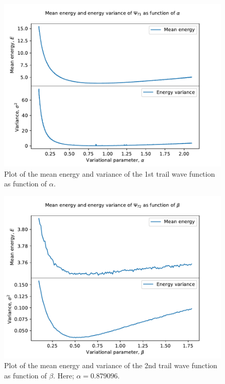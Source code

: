 \documentclass[12pt,english,a4paper]{article}
\begin{document}
\begin{figure}[H]
    \centering
    \includegraphics[scale=0.7]{../figures/plot_minima_trail_1.pdf}
    \caption{Plot of the mean energy and variance of the 1st trail wave function as function of $\alpha$.}
    \label{fig:minima_1}
\end{figure}
\begin{figure}[H]
    \centering
    \includegraphics[scale=0.7]{../figures/plot_minima_trail_2.pdf}
    \caption{Plot of the mean energy and variance of the 2nd trail wave function as function of $\beta$. Here; $\alpha=0.879096$.}
    \label{fig:minima_2}
\end{figure}
\end{document}
